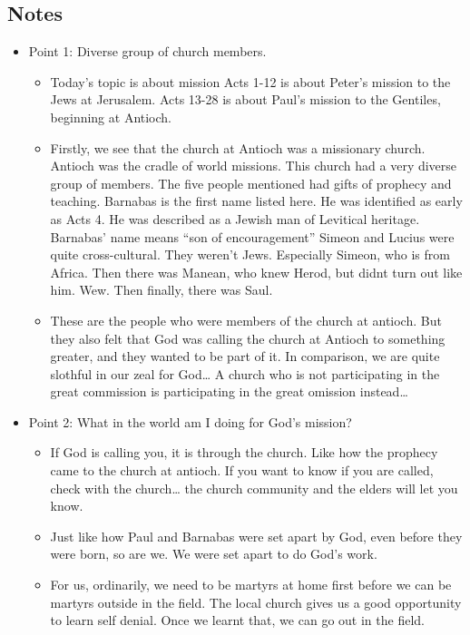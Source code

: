 \subsection*{Notes}
\begin{itemize}
  \item{Point 1: Diverse group of church members.
  \begin{itemize}
    \item{Today’s topic is about mission Acts 1-12 is about Peter’s mission
    to the Jews at Jerusalem.  Acts 13-28 is about Paul’s mission to the
    Gentiles, beginning at Antioch.}
    \item{Firstly, we see that the church at Antioch was a missionary church.
    Antioch was the cradle of world missions.  This church had a very diverse
    group of members.  The five people mentioned had gifts of prophecy and
    teaching.  Barnabas is the first name listed here.  He was identified as
    early as Acts 4.  He was described as a Jewish man of Levitical heritage.
    Barnabas’ name means “son of encouragement” Simeon and Lucius were quite
    cross-cultural.  They weren’t Jews.  Especially Simeon, who is from
    Africa.  Then there was Manean, who knew Herod, but didnt turn out like
    him.  Wew.  Then finally, there was Saul.}
    \item{These are the people who were members of the church at antioch.
    But they also felt that God was calling the church at Antioch to
    something greater, and they wanted to be part of it.  In comparison, we
    are quite slothful in our zeal for God… A church who is not participating
    in the great commission is participating in the great omission instead…}
  \end{itemize} }
  \item{Point 2: What in the world am I doing for God's mission?
  \begin{itemize}
    \item{If God is calling you, it is through the church. Like how the prophecy came to the church at antioch. If you want to know if you are called, check with the church… the church community and the elders will let you know.}
    \item{Just like how Paul and Barnabas were set apart by God, even before they were born, so are we. We were set apart to do God’s work.}
    \item{For us, ordinarily, we need to be martyrs at home first before we can be martyrs outside in the field. The local church gives us a good opportunity to learn self denial. Once we learnt that, we can go out in the field.}

\end{itemize}}
\end{itemize}
